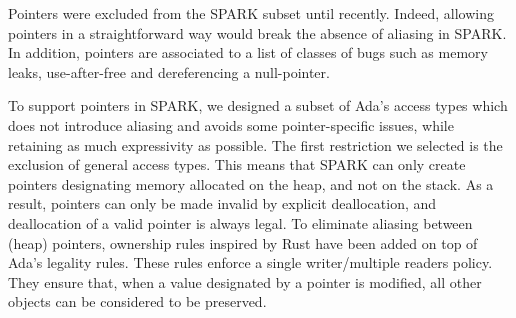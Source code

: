 \documentclass[runningheads]{llncs}
\begin{document}
Pointers were excluded from the SPARK subset until recently. Indeed, allowing pointers in a straightforward way would break the absence of aliasing in SPARK. In addition, pointers are associated to a list of classes of bugs such as memory leaks, use-after-free and dereferencing a null-pointer.%

To support pointers in SPARK, we designed a subset of Ada's access types which does not introduce aliasing and avoids some pointer-specific issues, while retaining as much expressivity as possible. The first restriction we selected is the exclusion of general access types. This means that SPARK can only create pointers designating memory allocated on the heap, and not on the stack. As a result, pointers can only be made invalid by explicit deallocation, and deallocation of a valid pointer is always legal. %
To eliminate aliasing between (heap) pointers, ownership rules inspired by Rust have been added on top of Ada's legality rules. These rules enforce a single writer/multiple readers policy. They ensure that, when a value designated by a pointer is modified, all other objects can be considered to be preserved.
\end{document}
